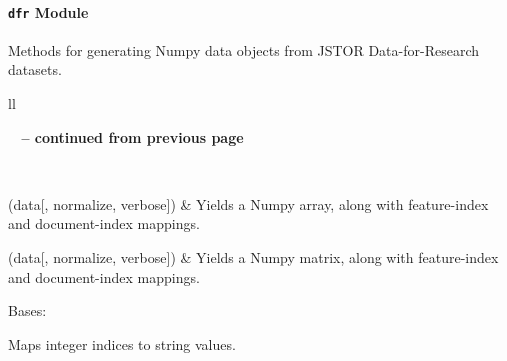 \documentclass[letterpaper,10pt,english]{sphinxmanual}
\begin{document}
\paragraph{\texttt{dfr} Module}
\label{tethne.matrices:module-tethne.matrices.dfr}\label{tethne.matrices:dfr-module}
Methods for generating Numpy data objects from JSTOR Data-for-Research datasets.

\begin{longtable}{ll}
\hline
\endfirsthead

%
{{\bfseries \tablename\ \thetable{} -- continued from previous page}} \\
\hline
\endhead

\hline {} \\ \hline
\endfoot

\hline
\endlastfoot


{\hyperref[tethne.matrices:tethne.matrices.dfr.array]{}}(data{[}, normalize, verbose{]})
 & 
Yields a Numpy array, along with feature-index and document-index mappings.
\\\hline

{\hyperref[tethne.matrices:tethne.matrices.dfr.matrix]{}}(data{[}, normalize, verbose{]})
 & 
Yields a Numpy matrix, along with feature-index and document-index mappings.
\\\hline
\end{longtable}


\begin{fulllineitems}
\label{tethne.matrices:tethne.matrices.dfr.Map}
Bases: 

Maps integer indices to string values.

\end{fulllineitems}

\end{document}
